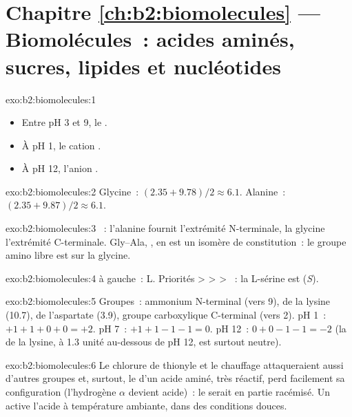\section*{Chapitre \ref{ch:b2:biomolecules} --- Biomolécules~: acides aminés, sucres, lipides et nucléotides}

\begin{solution}{exo:b2:biomolecules:1}
\begin{itemize}
  \item Entre pH 3 et 9, le  .
  \item À pH 1, le cation .
  \item À pH 12, l'anion .
\end{itemize}
\end{solution}

\begin{solution}{exo:b2:biomolecules:2}
Glycine~: $(2.35 + 9.78)/2 \approx 6.1$. Alanine~: $(2.35 + 9.87)/2 \approx 6.1$.
\end{solution}

\begin{solution}{exo:b2:biomolecules:3}
~: l'alanine fournit l'extrémité N-terminale, la glycine l'extrémité
C-terminale. Gly--Ala, , en est un isomère de constitution~: le groupe
amino libre est sur la glycine.
\end{solution}

\begin{solution}{exo:b2:biomolecules:4}
 à gauche~: L. Priorités  >  >  > ~: la L-sérine est
(\textit{S}).
\end{solution}

\begin{solution}{exo:b2:biomolecules:5}
Groupes~: ammonium N-terminal (vers 9),  de la lysine (10.7),  de
l'aspartate (3.9), groupe carboxylique C-terminal (vers 2). pH 1~: $+1 +1 + 0 + 0 = +2$. pH 7~: $+1 +1 -1 -1 = 0$. pH 12~:
$0 + 0 - 1 - 1 = -2$ (la  de la lysine, à 1.3 unité au-dessous de pH 12, est surtout neutre).
\end{solution}

\begin{solution}{exo:b2:biomolecules:6}
Le chlorure de thionyle et le chauffage attaqueraient aussi d'autres groupes et, surtout, le  d'un acide aminé, très réactif, perd facilement sa configuration (l'hydrogène $\alpha$ devient
acide)~: le  serait en partie racémisé. Un  active l'acide à température
ambiante, dans des conditions douces.
\end{solution}

